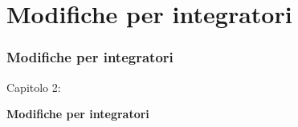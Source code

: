 %

\section{Modifiche per integratori}
\begin{frame}[fragile]
	\frametitle{Modifiche per integratori}

	\begin{center}\huge{Capitolo 2:}\end{center}
	\begin{center}\huge{\color{typo3darkgrey}\textbf{Modifiche per integratori}}\end{center}

\end{frame}


